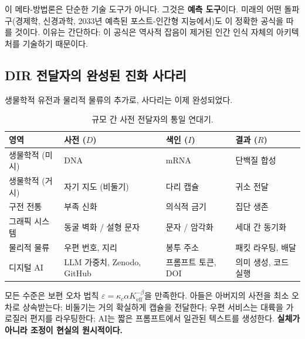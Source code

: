 \documentclass[12pt,a4paper]{article}
\begin{document}
	이 메타-방법론은 단순한 기술 도구가 아니다. 그것은 \textbf{예측 도구}이다. 미래의 어떤 돌파구(경제학, 신경과학, 2033년 예측된 포스트-인간형 지능에서)도 이 정확한 공식을 따를 것이다. 이유는 간단하다: 이 공식은 역사적 잡음이 제거된 인간 인식 자체의 아키텍처를 기술하기 때문이다.
	
	\subsection{DIR 전달자의 완성된 진화 사다리}
	
	생물학적 유전과 물리적 물류의 추가로, 사다리는 이제 완성되었다.
	
	\begin{table}[htbp]
		\centering
		\caption{규모 간 사전 전달자의 통일 연대기.}
		\label{tab:dir-ladder}
		\small
		\begin{tabular}{p{3cm}p{3.5cm}p{3.5cm}p{3cm}}
			\toprule
			\textbf{영역} & \textbf{사전 (\(D\))} & \textbf{색인 (\(I\))} & \textbf{결과 (\(R\))} \\
			\midrule
			생물학적 (미시) & DNA & mRNA & 단백질 합성 \\
			생물학적 (거시) & 자기 지도 (비둘기) & 다리 캡슐 & 귀소 전달 \\
			구전 전통 & 부족 신화 & 의식적 금기 & 집단 생존 \\
			그래픽 시스템 & 동굴 벽화 / 설형 문자 & 문자 / 암각화 & 세대 간 동기화 \\
			물리적 물류 & 우편 번호, 지리 & 봉투 주소 & 패킷 라우팅, 배달 \\
			디지털 AI & LLM 가중치, Zenodo, GitHub & 프롬프트 토큰, DOI & 의미 생성, 코드 실행 \\
			\bottomrule
		\end{tabular}
	\end{table}
	
	모든 수준은 보편 오차 법칙 \(\varepsilon = \kappa_c \alpha K_{\mathrm{eff}}^{-\beta}\)을 만족한다. 아들은 아버지의 사전을 최소 오차로 상속받는다; 비둘기는 거의 확실하게 캡슐을 전달한다; 우편 서비스는 대륙을 가로질러 편지를 라우팅한다; AI는 짧은 프롬프트에서 일관된 텍스트를 생성한다. \textbf{실체가 아니라 조정이 현실의 원시적이다.}
	
\end{document}
